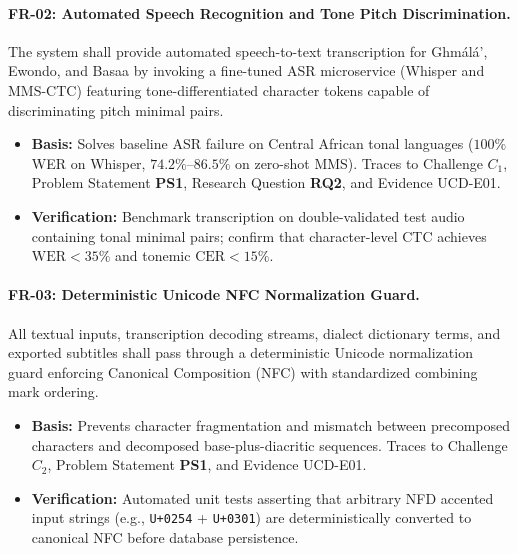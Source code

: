 \documentclass[conference]{IEEEtran}
\begin{document}
\paragraph{FR-02: Automated Speech Recognition and Tone Pitch Discrimination.}
The system shall provide automated speech-to-text transcription for Gh\textopeno m\'al\'a', Ewondo, and Basaa by invoking a fine-tuned ASR microservice (Whisper and MMS-CTC) featuring tone-differentiated character tokens capable of discriminating pitch minimal pairs.
\begin{itemize}
    \item \textbf{Basis:} Solves baseline ASR failure on Central African tonal languages ($100\%$ WER on Whisper, $74.2\%\text{--}86.5\%$ on zero-shot MMS). Traces to Challenge $C_1$, Problem Statement \textbf{PS1}, Research Question \textbf{RQ2}, and Evidence UCD-E01.
    \item \textbf{Verification:} Benchmark transcription on double-validated test audio containing tonal minimal pairs; confirm that character-level CTC achieves $\text{WER} < 35\%$ and tonemic $\text{CER} < 15\%$.
\end{itemize}

\paragraph{FR-03: Deterministic Unicode NFC Normalization Guard.}
All textual inputs, transcription decoding streams, dialect dictionary terms, and exported subtitles shall pass through a deterministic Unicode normalization guard enforcing Canonical Composition (NFC) with standardized combining mark ordering.
\begin{itemize}
    \item \textbf{Basis:} Prevents character fragmentation and mismatch between precomposed characters and decomposed base-plus-diacritic sequences. Traces to Challenge $C_2$, Problem Statement \textbf{PS1}, and Evidence UCD-E01.
    \item \textbf{Verification:} Automated unit tests asserting that arbitrary NFD accented input strings (e.g., \texttt{U+0254} + \texttt{U+0301}) are deterministically converted to canonical NFC before database persistence.
\end{itemize}
\end{document}
